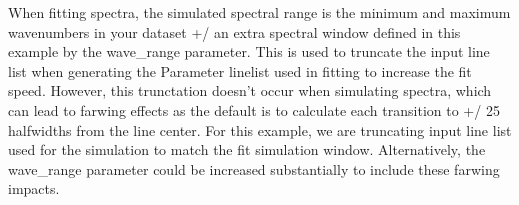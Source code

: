 \documentclass[letterpaper,10pt,english]{sphinxmanual}
\begin{document}
\begin{sphinxVerbatim}[commandchars=\\\{\}]
   
   

   
  
   
   
  
  
  
  
  
  
  
  
  
\end{sphinxVerbatim}

\sphinxAtStartPar
When fitting spectra, the simulated spectral range is the minimum and maximum wavenumbers in your dataset +/\sphinxhyphen{} an extra spectral window defined in this example by the wave\_range parameter.  This is used to truncate the input line list when generating the Parameter linelist used in fitting to increase the fit speed.  However, this trunctation doesn’t occur when simulating spectra, which can lead to far\sphinxhyphen{}wing effects as the default is to calculate each transition to +/\sphinxhyphen{} 25 half\sphinxhyphen{}widths from the line center.  For this example, we are truncating input line list used for the simulation to match the fit simulation window.  Alternatively, the wave\_range parameter could be increased substantially to include these far\sphinxhyphen{}wing impacts.
\end{document}
